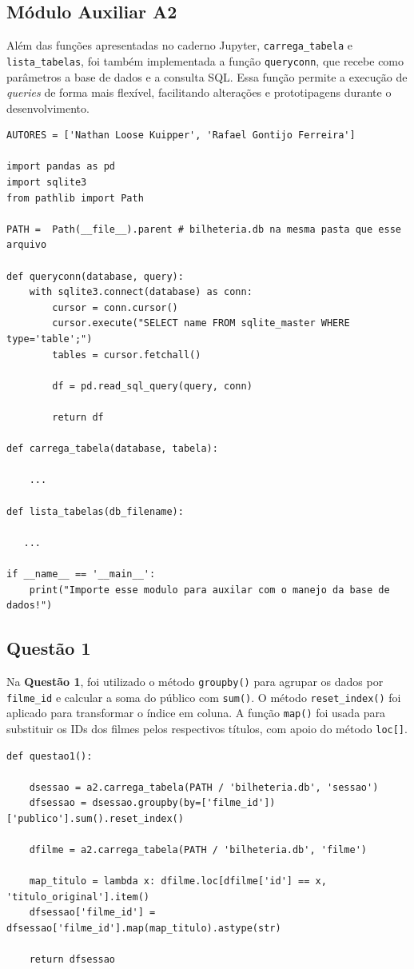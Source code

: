 \documentclass{article}
\begin{document}
\subsection*{Módulo Auxiliar A2}
Além das funções apresentadas no caderno Jupyter, \texttt{carrega\_tabela} e \texttt{lista\_tabelas}, foi também implementada a função \texttt{queryconn}, que recebe como parâmetros a base de dados e a consulta SQL. Essa função permite a execução de \textit{queries} de forma mais flexível, facilitando alterações e prototipagens durante o desenvolvimento.
\linespread{1}
\begin{lstlisting}
AUTORES = ['Nathan Loose Kuipper', 'Rafael Gontijo Ferreira']

import pandas as pd 
import sqlite3
from pathlib import Path

PATH =  Path(__file__).parent # bilheteria.db na mesma pasta que esse arquivo

def queryconn(database, query):
    with sqlite3.connect(database) as conn:
        cursor = conn.cursor()
        cursor.execute("SELECT name FROM sqlite_master WHERE type='table';")
        tables = cursor.fetchall()

        df = pd.read_sql_query(query, conn)
        
        return df
    
def carrega_tabela(database, tabela):

    ...

def lista_tabelas(db_filename):

   ...
    
if __name__ == '__main__':
    print("Importe esse modulo para auxilar com o manejo da base de dados!")
\end{lstlisting}
\linespread{1.5}
\subsection*{Questão 1}
Na \textbf{Questão 1}, foi utilizado o método \texttt{groupby()} para agrupar os dados por \texttt{filme\_id} e calcular a soma do público com \texttt{sum()}. O método \texttt{reset\_index()} foi aplicado para transformar o índice em coluna. A função \texttt{map()} foi usada para substituir os IDs dos filmes pelos respectivos títulos, com apoio do método \texttt{loc[]}.
\linespread{1}
\begin{lstlisting}
def questao1():
    
    dsessao = a2.carrega_tabela(PATH / 'bilheteria.db', 'sessao')
    dfsessao = dsessao.groupby(by=['filme_id'])['publico'].sum().reset_index()

    dfilme = a2.carrega_tabela(PATH / 'bilheteria.db', 'filme')
    
    map_titulo = lambda x: dfilme.loc[dfilme['id'] == x, 'titulo_original'].item()
    dfsessao['filme_id'] =  dfsessao['filme_id'].map(map_titulo).astype(str)
    
    return dfsessao
\end{lstlisting}
\linespread{1.5}
\end{document}
